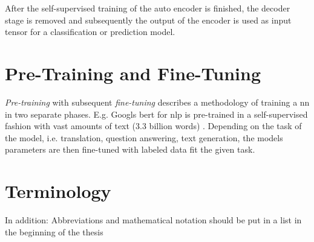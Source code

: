 After the self-supervised training of the auto encoder is finished, the decoder stage is removed and subsequently the output of the encoder is used as input tensor for a classification or prediction model. 

\section{Pre-Training and Fine-Tuning}

\textit{Pre-training} with subsequent \textit{fine-tuning} describes a methodology of training a \gls{nn} in two separate phases. E.g. Googls \gls{bert} for \gls{nlp} is pre-trained in a self-supervised fashion with vast amounts of text (3.3 billion words) \cite{bert}. Depending on the task of the model, i.e. translation, question answering, text generation, the models parameters are then fine-tuned with labeled data fit the given task.

\section{Terminology} \label{subsec.terminology}

In addition: Abbreviations and mathematical notation should be put in a list in the beginning of the thesis 

\newpage